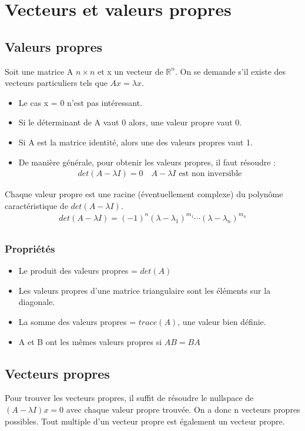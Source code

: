 \documentclass[a4paper]{book}
\begin{document}
\chapter{Vecteurs et valeurs propres}
\section{Valeurs propres}
Soit une matrice A $n\times n$ et x un vecteur de $\mathbb{R}^n$. On se demande s'il existe des vecteurs particuliers tels que $Ax = \lambda x$.
\begin{itemize}
    \item Le cas x = 0 n'est pas intéressant.
    \item Si le déterminant de A vaut 0 alors, une valeur propre vaut 0.
    \item Si A est la matrice identité, alors une des valeurs propres vaut 1.
    \item De manière générale, pour obtenir les valeurs propres, il faut résoudre :
    \begin{gather}
        det(A-\lambda I) = 0 \quad \text{$A-\lambda I$ est non inversible}
    \end{gather}
\end{itemize}
Chaque valeur propre est une racine (éventuellement complexe) du polynôme caractéristique de $det(A-\lambda I)$.
\begin{gather}
    det(A-\lambda I)=(-1)^n(\lambda-\lambda_1)^{m_1}\cdots(\lambda-\lambda_n)^{m_n} \\
\end{gather}
\subsection{Propriétés}
\begin{itemize}
    \item Le produit des valeurs propres = $det(A)$
    \item Les valeurs propres d'une matrice triangulaire sont les éléments sur la diagonale.
    \item La somme des valeurs propres  = $trace(A)$, une valeur bien définie.
    \item A et B ont les mêmes valeurs propres si $AB = BA$
\end{itemize}
\section{Vecteurs propres}
Pour trouver les vecteurs propres, il suffit de résoudre le nullspace de $(A-\lambda I) x = 0$ avec chaque valeur propre trouvée. On a donc n vecteurs propres possibles. Tout multiple d'un vecteur propre est également un vecteur propre.
\end{document}
